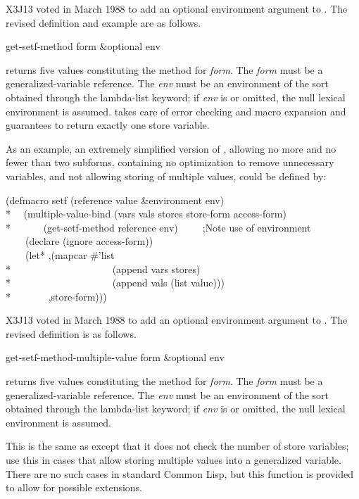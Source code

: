 \begin{newer}
X3J13 voted in March 1988 
to add an optional environment argument to .
The revised definition and example are as follows.

\begin{defun}[Function]
get-setf-method form &optional env

 returns
five values constituting the  method for \emph{form}.
The \emph{form} must be a
generalized-variable reference.
The \emph{env} must be an environment of the sort obtained through
the  lambda-list keyword; if \emph{env} is  or omitted,
the null lexical environment is assumed.
 takes care of
error checking and macro expansion and guarantees to return exactly one
store variable.

As an example, an extremely simplified version of ,
allowing no more and no fewer than two
subforms, containing no optimization to remove unnecessary variables, and
not allowing storing of multiple values, could be defined by:
\begin{lisp}
(defmacro setf (reference value \&environment env) \\*
~~(multiple-value-bind (vars vals stores store-form access-form) \\*
~~~~~~(get-setf-method reference env)~~~~~;\textrm{Note use of environment}\\
~~~~(declare (ignore access-form)) \\
~~~~{\Xbq}(let* ,(mapcar \#'list \\*
~~~~~~~~~~~~~~~~~~~~(append vars stores) \\*
~~~~~~~~~~~~~~~~~~~~(append vals (list value))) \\*
~~~~~~~,store-form)))
\end{lisp}
\end{defun}
\end{newer}

\begin{newer}
X3J13 voted in March 1988 
to add an optional environment argument to .
The revised definition is as follows.

\begin{defun}[Function]
get-setf-method-multiple-value form &optional env

returns five values constituting the  method for \emph{form}.
The \emph{form} must be a
generalized-variable reference.
The \emph{env} must be an environment of the sort obtained through
the  lambda-list keyword; if \emph{env} is  or omitted,
the null lexical environment is assumed.

This is the same as 
except that it does not check the number of store variables; use this
in cases that allow storing multiple values into a generalized variable.
There are no such cases in standard Common Lisp, but this function is provided
to allow for possible extensions.
\end{defun}

\end{newer}

